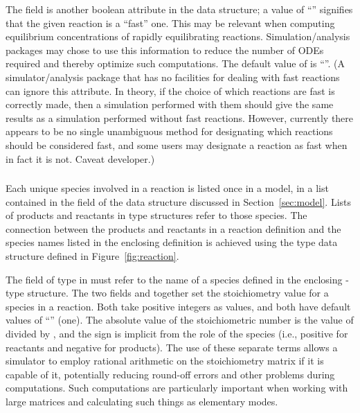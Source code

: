 \documentclass[10pt]{cekarticle}
\newcommand{\vref}[1]{\ref{#1}}
\newcommand{\changed}[1]{\textcolor{BrickRed}{#1}}
\begin{document}
The field  is another boolean attribute in the
 data structure; a value of ``''
signifies that the given reaction is a ``fast'' one.  This may be relevant
when computing equilibrium concentrations of rapidly equilibrating
reactions.  Simulation/analysis packages may chose to use this information
to reduce the number of ODEs required and thereby optimize such
computations.  The default value of  is
``''.  (A simulator/analysis package that has no
facilities for dealing with fast reactions can ignore this attribute.  In
theory, if the choice of which reactions are fast is correctly made, then a
simulation performed with them should give the same results as a simulation
performed without fast reactions.  However, currently there appears to be
no single unambiguous method for designating which reactions should be
considered fast, and some users may designate a reaction as fast when in
fact it is not.  Caveat developer.)


\subsubsection{\changed{}}
\label{subsec:speciesreference}

Each unique \changed{species} involved in a reaction is listed once in a
model, in a list contained in the \changed{} field of the
 data structure discussed in Section~\ref{sec:model}.  Lists
of products and reactants in  type structures refer to
those species.  The connection between the products and reactants in a
reaction definition and the \changed{species} names listed in the enclosing
 definition is achieved using the
\changed{} type data structure defined in
Figure~\vref{fig:reaction}.

The field \changed{} of type  in
\changed{} must refer to the name of a
\changed{species} defined in the enclosing -type structure.
The two fields  and  together set
the stoichiometry value for a \changed{species} in a reaction.  Both
\changed{take positive integers as values}, and both have default values of
``'' (one).  \changed{The absolute value of the
  stoichiometric number is the value of \attrib{stoichiometry} divided by
  \attrib{denominator}, and the sign is implicit from the role of the
  species (i.e., positive for reactants and negative for products).}  The
use of these separate terms allows a simulator to employ rational
arithmetic on the stoichiometry matrix \changed{if it is capable of it},
potentially reducing round-off errors and other problems during
computations.  Such computations are particularly important when working
with large matrices and calculating such things as elementary modes.
\end{document}
